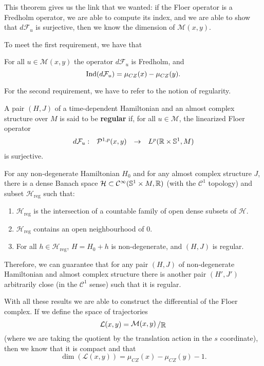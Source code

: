 This theorem gives us the link that we wanted: if the Floer operator is a Fredholm operator, we are able to compute its index, and we are able to show that $d\mathcal{F}_u$ is surjective, then we know the dimension of $\mathcal{M}(x,y)$.

To meet the first requirement, we have that

\begin{theo} \label{theo:floer_fredholm}
For all $u \in \mathcal{M}(x,y)$ the operator $d\mathcal{F}_u$ is Fredholm, and
\[\mathrm{Ind}(d\mathcal{F}_u) = \mu_{CZ}(x) - \mu_{CZ}(y) .\]
\end{theo}

For the second requirement, we have to refer to the notion of regularity.

\begin{deff}
A pair $(H,J)$ of a time-dependent Hamiltonian and an almost complex structure over $M$ is said to be {\bf regular} if, for all $u \in \mathcal{M}$, the linearized Floer operator
\[\begin{array}{rccc} d\mathcal{F}_u : & \mathcal{P}^{1,p}(x,y) & \rightarrow & L^p(\mathbb{R}\times\mathbb{S}^1,M) \end{array}\]
is surjective.
\end{deff}

\begin{theo} \label{theo:regular}
For any non-degenerate Hamiltonian $H_0$ and for any almost complex structure $J$, there is a dense Banach space $\mathcal{H} \subset \mathcal{C}^{\infty}(\mathbb{S}^1 \times M, \mathbb{R})$ (with the $\mathcal{C}^1$ topology) and subset $\mathcal{H}_{\mathrm{reg}}$ such that:
\begin{enumerate}
	\item $\mathcal{H}_{\mathrm{reg}}$ is the intersection of a countable family of open dense subsets of $\mathcal{H}$.
	\item $\mathcal{H}_{\mathrm{reg}}$ contains an open neighbourhood of $0$.
	\item For all $h \in \mathcal{H}_{\mathrm{reg}}$, $H = H_0 + h$ is non-degenerate, and $(H,J)$ is regular.
\end{enumerate}
\end{theo}

Therefore, we can guarantee that for any pair $(H,J)$ of non-degenerate Hamiltonian and almost complex structure there is another pair $(H',J')$ arbitrarily close (in the $\mathcal{C}^1$ sense) such that it is regular.

With all these results we are able to construct the differential of the Floer complex. If we define the space of trajectories
\[\mathcal{L}(x,y) = \quocient{\mathcal{M}(x,y)}{\R}\]
(where we are taking the quotient by the translation action in the $s$ coordinate), then we know that it is compact and that
\[\dim(\mathcal{L}(x,y)) = \mu_{CZ}(x)-\mu_{CZ}(y)-1 .\]


